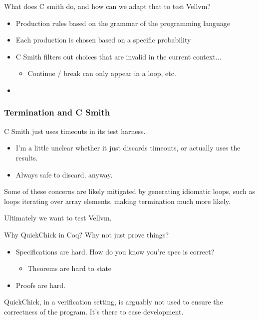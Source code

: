 \documentclass{beamer}
\begin{document}
\begin{frame}
  What does C smith do, and how can we adapt that to test Vellvm?

  \begin{itemize}
  \item Production rules based on the grammar of the programming
    language
  \item Each production is chosen based on a specific probability
  \item C Smith filters out choices that are invalid in the current
    context...
    \begin{itemize}
    \item Continue / break can only appear in a loop, etc.
    \end{itemize}
  \item 
  \end{itemize}
\end{frame}

\begin{frame}
  \frametitle{Termination and C Smith}

  C Smith just uses timeouts in its test harness.

  \begin{itemize}
  \item I'm a little unclear whether it just discards timeouts, or
    actually uses the results.
  \item Always safe to discard, anyway.
  \end{itemize}

  Some of these concerns are likely mitigated by generating idiomatic
  loops, such as loops iterating over array elements, making
  termination much more likely.
\end{frame}
\begin{frame}
  Ultimately we want to test Vellvm.
\end{frame}

\begin{frame}
  Why QuickChick in Coq? Why not just prove things?

  \begin{itemize}
  \item Specifications are hard. How do you know you're spec is
    correct?
    \begin{itemize}
    \item Theorems are hard to state
    \end{itemize}
  \item Proofs are hard.
  \end{itemize}

  QuickChick, in a verification setting, is arguably not used to
  ensure the correctness of the program. It's there to ease
  development.
\end{frame}
\end{document}
